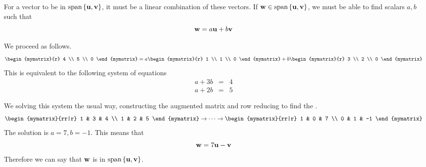 \begin{solution}
For a vector to be in $\mbox{span} \left\{ {\bf u}, {\bf v} \right\}$, it must be a linear combination of these vectors. If ${\bf w} \in \mbox{span} \left\{ {\bf u}, {\bf v} \right\}$, we must be able to find scalars $a,b$ such that\[
{\bf w} = a {\bf u} +b {\bf v}
\]

We proceed as follows.
\[
\begin{mymatrix}{r}
4 \\
5 \\
0
\end{mymatrix}
=
a 
\begin{mymatrix}{r}
1 \\
1 \\
0
\end{mymatrix}
+
b
\begin{mymatrix}{r}
3 \\
2 \\
0
\end{mymatrix}
\]
This is equivalent to the following system of equations
\begin{eqnarray*}
a + 3b &=& 4 \\
a + 2b &=& 5
\end{eqnarray*}

We solving this system the usual way, constructing the augmented matrix and row reducing to find the {\rref}.
\[
\begin{mymatrix}{rr|r}
1 & 3 & 4 \\
1 & 2 & 5 
\end{mymatrix}
\rightarrow \cdots \rightarrow
\begin{mymatrix}{rr|r}
1 & 0 & 7 \\
0 & 1 & -1
\end{mymatrix}
\]
The solution is $a=7, b=-1$. This means that 
\[
{\bf w} = 7 {\bf u} - {\bf v}
\] 
Therefore we can say that ${\bf w}$ is in $\mbox{span} \left\{ {\bf u}, {\bf v} \right\}$. 
\end{solution}
